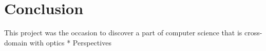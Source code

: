 \chapter{Conclusion}
This project was the occasion to discover a part of computer science that is cross-domain with optics 
* Perspectives